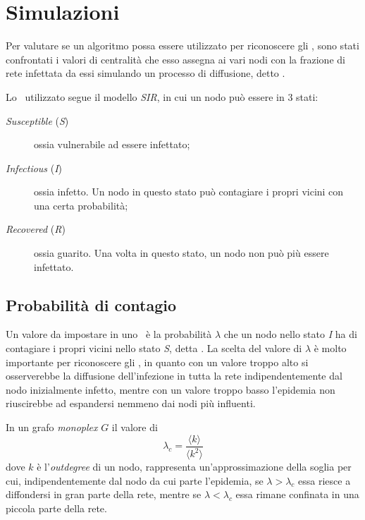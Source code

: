 \chapter{Simulazioni}

Per valutare se un algoritmo possa essere utilizzato per riconoscere gli \infsp, 
sono stati confrontati i valori di centralità che esso assegna ai vari nodi con la frazione di 
rete infettata da essi simulando un processo di diffusione, detto \spproc.

Lo \spproc\ utilizzato segue il modello \textit{SIR}, in cui un nodo può essere in 3 stati:
\begin{description}
    \item[\textit{Susceptible} (\textit{S})] ossia vulnerabile ad essere infettato;
    \item[\textit{Infectious} (\textit{I})] ossia infetto. Un nodo in questo stato può contagiare
        i propri vicini con una certa probabilità;
    \item[\textit{Recovered} (\textit{R})] ossia guarito. Una volta in questo stato, un nodo non può più essere
        infettato.
\end{description}

\section{Probabilità di contagio}
\label{sec:epprob}
Un valore da impostare in uno \spproc\ è la probabilità $\lambda$ che un nodo nello stato \textit{I}
ha di contagiare i propri vicini nello stato \textit{S}, detta \epprob.
La scelta del valore di $\lambda$ è molto importante per riconoscere gli \infsp, 
in quanto con un valore troppo alto si osserverebbe la diffusione dell'infezione in tutta la 
rete indipendentemente dal nodo inizialmente infetto, mentre con un valore troppo basso l'epidemia 
non riuscirebbe ad espandersi nemmeno dai nodi più influenti. 

In un grafo \textit{monoplex} $G$ il valore di \crepp\
\begin{equation}
    \lambda_c = \frac{\langle k  \rangle}{\langle k^2 \rangle}
\end{equation}
dove $k$ è l'\textit{outdegree} di un nodo, rappresenta un'approssimazione della soglia per 
cui, indipendentemente dal nodo da cui parte l'epidemia, se $\lambda > \lambda_c$ essa riesce 
a diffondersi in gran parte della rete, mentre se $\lambda < \lambda_c$ essa rimane confinata 
in una piccola parte della rete\cite{saumell:epidemicsp}.

